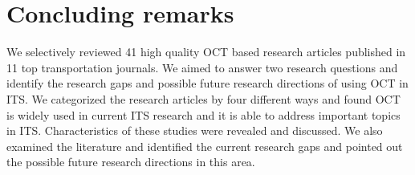 \documentclass[12pt,onecolumn,twoside]{JCTA}
\theoremstyle{mystyle}
\begin{document}
\section{Concluding remarks}
We selectively reviewed 41 high quality OCT based research articles published in 11 top transportation journals. We aimed to answer two research questions and identify the research gaps and possible future research directions of using OCT in ITS. We categorized the research articles by four different ways and found OCT is widely used in current ITS research and it is able to address important topics in ITS. Characteristics of these studies were revealed and discussed. We also examined the literature and identified the current research gaps and pointed out the possible future research directions in this area.
\begin{thebibliography}{99}



\end{thebibliography}
\end{document}
